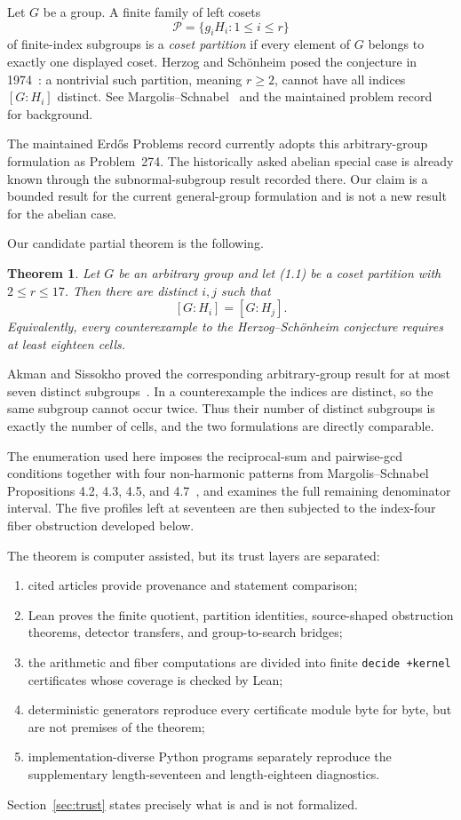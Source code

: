 \documentclass[11pt]{article}
\newtheorem{theorem}{Theorem}[section]
\theoremstyle{definition}
\begin{document}
Let $G$ be a group. A finite family of left cosets
\[
  \mathcal P=\{g_iH_i:1\leq i\leq r\}
  \tag{1.1}
\]
of finite-index subgroups is a \emph{coset partition} if every element of $G$
belongs to exactly one displayed coset. Herzog and Sch\"onheim posed the
conjecture in 1974~\cite{HS74}: a nontrivial such partition, meaning $r\geq2$,
cannot have all indices $[G:H_i]$ distinct. See
Margolis--Schnabel~\cite{MS19} and the maintained problem
record~\cite{Erdos274} for background.

The maintained Erd\H{o}s Problems record currently adopts this arbitrary-group
formulation as Problem~274. The historically asked abelian special case is
already known through the subnormal-subgroup result recorded there. Our claim
is a bounded result for the current general-group formulation and is not a new
result for the abelian case.

Our candidate partial theorem is the following.

\begin{theorem}\label{thm:main}
Let $G$ be an arbitrary group and let \emph{(1.1)} be a coset partition with
$2\leq r\leq17$. Then there are distinct $i,j$ such that
\[
  [G:H_i]=[G:H_j].
\]
Equivalently, every counterexample to the Herzog--Sch\"onheim conjecture
requires at least eighteen cells.
\end{theorem}

Akman and Sissokho proved the corresponding arbitrary-group result for at
most seven distinct subgroups~\cite[Theorem~6]{AS25}. In a counterexample the
indices are distinct, so the same subgroup cannot occur twice. Thus their
number of distinct subgroups is exactly the number of cells, and the two
formulations are directly comparable.

The enumeration used here imposes the reciprocal-sum and pairwise-gcd
conditions together with four non-harmonic patterns from
Margolis--Schnabel Propositions 4.2, 4.3, 4.5, and 4.7~\cite{MS19}, and
examines the full remaining denominator interval. The five profiles left at
seventeen are then subjected to the index-four fiber obstruction developed
below.

The theorem is computer assisted, but its trust layers are separated:
\begin{enumerate}[label=(\roman*)]
\item cited articles provide provenance and statement comparison;
\item Lean proves the finite quotient, partition identities, source-shaped
      obstruction theorems, detector transfers, and group-to-search bridges;
\item the arithmetic and fiber computations are divided into finite
      \texttt{decide +kernel} certificates whose coverage is checked by Lean;
\item deterministic generators reproduce every certificate module byte for
      byte, but are not premises of the theorem;
\item implementation-diverse Python programs separately reproduce the
      supplementary length-seventeen and length-eighteen diagnostics.
\end{enumerate}
Section~\ref{sec:trust} states precisely what is and is not formalized.
\end{document}
